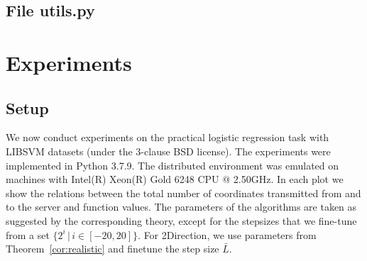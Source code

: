 \documentclass{article} %
\theoremstyle{plain}
\theoremstyle{definition}
\theoremstyle{remark}
\newcommand{\green}{\color{mydarkgreen}}
\newcommand{\algname}[1]{{\small\green\sf #1}}
\begin{document}
\newpage
\subsection{File utils.py}



\lstset{style=mystyle}



\newpage
\section{Experiments}
\label{sec:experiments}
\subsection{Setup}

We now conduct experiments on the practical logistic regression task with LIBSVM datasets \citep{chang2011libsvm} (under the 3-clause BSD license). The experiments were implemented in Python 3.7.9. The distributed environment was emulated on machines with Intel(R) Xeon(R) Gold 6248 CPU @ 2.50GHz. In each plot we show the relations between the total number of coordinates transmitted from and to the server and function values. The parameters of the algorithms are taken as suggested by the corresponding theory, except for the stepsizes that we fine-tune from a set $\{2^i\,|\,i \in [-20, 20]\}$. For \algname{2Direction}, we use parameters from Theorem~\ref{cor:realistic} and finetune the step size $\bar{L}.$
\end{document}
